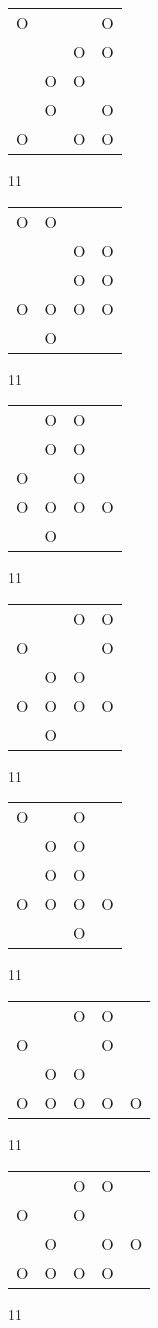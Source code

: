 \begin{tabular}{|m{0.2cm}m{0.2cm}m{0.2cm}m{0.2cm}|}\hline
O& & &O\\
 & &O&O\\
 &O&O& \\
 &O& &O\\
O& &O&O\\
\hline\end{tabular}11
\begin{tabular}{|m{0.2cm}m{0.2cm}m{0.2cm}m{0.2cm}|}\hline
O&O& & \\
 & &O&O\\
 & &O&O\\
O&O&O&O\\
 &O& & \\
\hline\end{tabular}11
\begin{tabular}{|m{0.2cm}m{0.2cm}m{0.2cm}m{0.2cm}|}\hline
 &O&O& \\
 &O&O& \\
O& &O& \\
O&O&O&O\\
 &O& & \\
\hline\end{tabular}11
\begin{tabular}{|m{0.2cm}m{0.2cm}m{0.2cm}m{0.2cm}|}\hline
 & &O&O\\
O& & &O\\
 &O&O& \\
O&O&O&O\\
 &O& & \\
\hline\end{tabular}11
\begin{tabular}{|m{0.2cm}m{0.2cm}m{0.2cm}m{0.2cm}|}\hline
O& &O& \\
 &O&O& \\
 &O&O& \\
O&O&O&O\\
 & &O& \\
\hline\end{tabular}11
\begin{tabular}{|m{0.2cm}m{0.2cm}m{0.2cm}m{0.2cm}m{0.2cm}|}\hline
 & &O&O& \\
O& & &O& \\
 &O&O& & \\
O&O&O&O&O\\
\hline\end{tabular}11
\begin{tabular}{|m{0.2cm}m{0.2cm}m{0.2cm}m{0.2cm}m{0.2cm}|}\hline
 & &O&O& \\
O& &O& & \\
 &O& &O&O\\
O&O&O&O& \\
\hline\end{tabular}11
